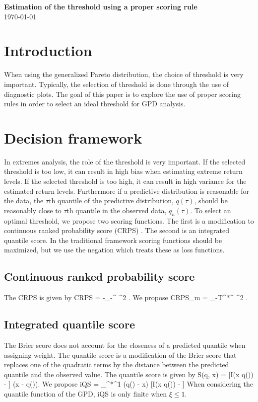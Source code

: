 \documentclass[11pt]{article}
\begin{document}
\linenumbers

\begin{center}
{\Large {\bf Estimation of the threshold using a proper scoring rule}}\\
\today
\end{center}

\section{Introduction}\label{s:intro}
When using the generalized Pareto distribution, the choice of threshold is very important.
Typically, the selection of threshold is done through the use of diagnostic plots.
The goal of this paper is to explore the use of proper scoring rules in order to select an ideal threshold for GPD analysis.

\section{Decision framework}\label{s:framework}
In extremes analysis, the role of the threshold is very important.
If the selected threshold is too low, it can result in high bias when estimating extreme return levels.
If the selected threshold is too high, it can result in high variance for the estimated return levels.
Furthermore if a predictive distribution is reasonable for the data, the $\tau$th quantile of the predictive distribution, $q(\tau)$, should be reasonably close to $\tau$th quantile in the observed data, $q_n(\tau)$.
To select an optimal threshold, we propose two scoring functions.
The first is a modification to continuous ranked probability score (CRPS) \citep{Gneiting2007}. 
The second is an integrated quantile score.
In the traditional framework scoring functions should be maximized, but we use the negation which treats these as loss functions.

\subsection{Continuous ranked probability score}
The CRPS \citep{Gneiting2007} is given by
\beqn
    CRPS = -\int_{-\infty}^{\infty} ^2 \dq.
\eeqn
We propose
\beqn
    CRPS_m = \int_{-T^*}^{\infty} ^2 \dq.
\eeqn

\subsection{Integrated quantile score}
The Brier score does not account for the closeness of a predicted quantile when assigning weight.
The quantile score \citep{Gneiting2007} is a modification of the Brier score that replaces one of the quadratic terms by the distance between the predicted quantile and the observed value.
The quantile score is given by
\beqn
    S(q, x) = [I(x \le q(\tau)) - \tau] (x - q(\tau)).
\eeqn
We propose
\beqn
    iQS = \int_{\tau^*}^1 (q(\tau) - x) [I(x \le q(\tau)) - \tau] \dtau
\eeqn
When considering the quantile function of the GPD, iQS is only finite when $\xi \le 1$.
\end{document}
